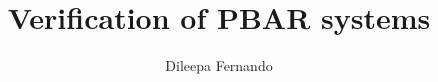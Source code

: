 \documentclass[]{report}
\title{Verification of PBAR systems}
\author{Dileepa Fernando}
\begin{document}
\maketitle

\begin{abstract}
\end{abstract}



\end{document}
